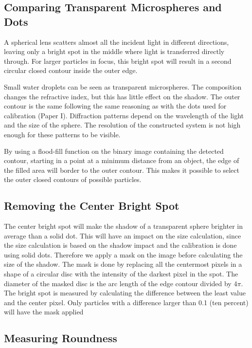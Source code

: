 \subsection{Comparing Transparent Microspheres and Dots}

A spherical lens scatters almost all the incident light in different directions, leaving only a bright spot in the middle where light is transferred directly through. For larger particles in focus, this bright spot will result in a second circular closed contour inside the outer edge. 

Small water droplets can be seen as transparent microspheres. The composition changes the refractive index, but this has little effect on the shadow. The outer contour is the same following the same reasoning as with the dots used for calibration \cite{ryd2015}(Paper I). Diffraction patterns depend on the wavelength of the light and the size of the sphere. The resolution of the constructed system is not high enough for these patterns to be visible.

By using a flood-fill function on the binary image containing the detected contour, starting in a point at a minimum distance from an object, the edge of the filled area will border to the outer contour. This makes it possible to select the outer closed contours of possible particles.

\subsection{Removing the Center Bright Spot}

The center bright spot will make the shadow of a transparent sphere brighter in average than a solid dot. This will have an impact on the size calculation, since the size calculation is based on the shadow impact and the calibration is done using solid dots. Therefore we apply a mask on the image before calculating the size of the shadow. The mask is done by replacing all the centermost pixels in a shape of a circular disc with the intensity of the darkest pixel in the spot. The diameter of the masked disc is the arc length of the edge contour divided by 4$\pi$. The bright spot is measured by calculating the difference between the least value and the center pixel. Only particles with a difference larger than 0.1 (ten percent) will have the mask applied

\subsection{Measuring Roundness}

